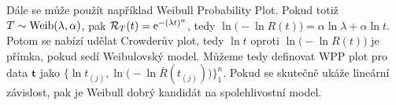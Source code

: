 Dále se může použít například Weibull Probability Plot. Pokud totiž $T\sim\mathrm{Weib}(\lambda,\alpha)$, pak $\mathcal{R}_T(t)=\mathrm{e}^{-(\lambda t)^\alpha}$, tedy $\ln\big(-\ln R(t)\big)=\alpha\ln\lambda+\alpha\ln t$. Potom se nabízí udělat Crowderův plot, tedy $\ln t$ oproti $\ln\big(-\ln R(t)\big)$ je přímka, pokud sedí Weibulovský model. Můžeme tedy definovat WPP plot pro data $\textbf{t}$ jako $\big\{\ln t_{(j)},\ln\big(-\ln \overline{R}(t_{(j)})\big)\}_1^n$. Pokud se skutečně ukáže lineární závislost, pak je Weibull dobrý kandidát na spolehlivostní model.


\



